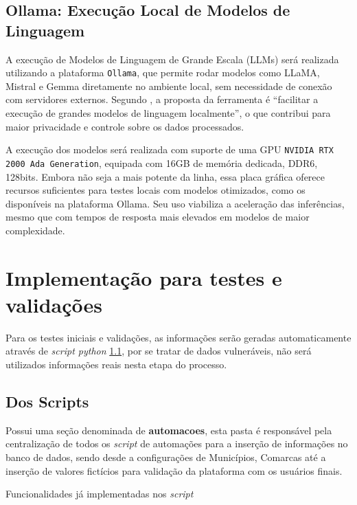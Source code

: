 \subsection{Ollama: Execução Local de Modelos de Linguagem}
\par A execução de Modelos de Linguagem de Grande Escala (LLMs) será realizada utilizando a plataforma \texttt{Ollama}, que permite rodar modelos como LLaMA, Mistral e Gemma diretamente no ambiente local, sem necessidade de conexão com servidores externos. Segundo , a proposta da ferramenta é “facilitar a execução de grandes modelos de linguagem localmente”, o que contribui para maior privacidade e controle sobre os dados processados.
\par A execução dos modelos será realizada com suporte de uma GPU \texttt{NVIDIA RTX 2000 Ada Generation}, equipada com 16GB de memória dedicada, DDR6, 128bits. Embora não seja a mais potente da linha, essa placa gráfica oferece recursos suficientes para testes locais com modelos otimizados, como os disponíveis na plataforma Ollama. Seu uso viabiliza a aceleração das inferências, mesmo que com tempos de resposta mais elevados em modelos de maior complexidade.


\section{Implementação para testes e validações}
\par Para os testes iniciais e validações, as informações serão geradas automaticamente através de \textit{script python} \ref{script}, por se tratar de dados vulneráveis, não será utilizados informações reais nesta etapa do processo.

\subsection{Dos Scripts}\label{script}
\par Possui uma seção denominada de \textbf{automacoes}, esta pasta é responsável pela centralização de todos os \textit{script} de automações para a inserção de informações no banco de dados, sendo desde a configurações de Municípios, Comarcas até a inserção de valores fictícios para validação da plataforma com os usuários finais.
\par Funcionalidades já implementadas nos \textit{script}

